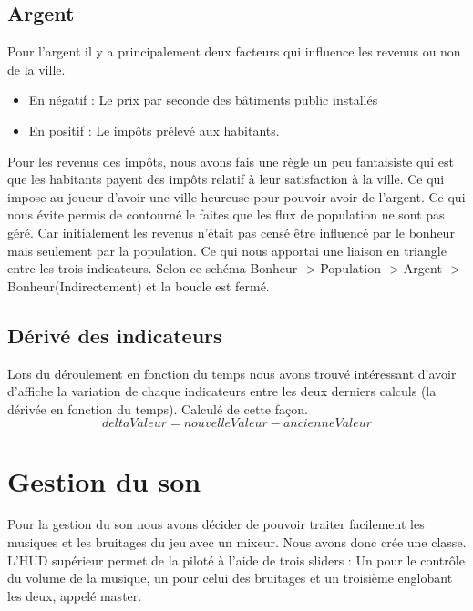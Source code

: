 \documentclass[a4paper,10pt,openany,oneside]{book}
\begin{document}
\subsection{Argent}
Pour l'argent il y a principalement deux facteurs qui influence les revenus ou non de la ville.
\begin{itemize}
	\item En négatif : Le prix par seconde des bâtiments public installés
	\item En positif : Le impôts prélevé aux habitants.
\end{itemize}
Pour les revenus des impôts, nous avons fais une règle un peu fantaisiste qui est que les habitants payent des impôts relatif à leur satisfaction à la ville. Ce qui impose au joueur d'avoir une ville heureuse pour pouvoir avoir de l'argent. Ce qui nous évite permis de contourné le faites que les flux de population ne sont pas géré. Car initialement les revenus n'était pas censé être influencé par le bonheur mais seulement par la population. Ce qui nous apportai une liaison en triangle entre les trois indicateurs.
Selon ce schéma Bonheur -> Population -> Argent -> Bonheur(Indirectement) et la boucle est fermé.

\subsection{Dérivé des indicateurs}
Lors du déroulement en fonction du temps nous avons trouvé intéressant d'avoir d'affiche la variation de chaque indicateurs entre les deux derniers calculs (la dérivée en fonction du temps). Calculé de cette façon. \[deltaValeur = nouvelleValeur - ancienneValeur\]

\section{Gestion du son}
Pour la gestion du son nous avons décider de pouvoir traiter facilement les musiques et les bruitages du jeu avec un mixeur. Nous avons donc crée une classe. L'HUD supérieur permet de la piloté à l'aide de trois sliders : Un pour le contrôle du volume de la musique, un pour celui des bruitages et un troisième englobant les deux, appelé master.
\end{document}
